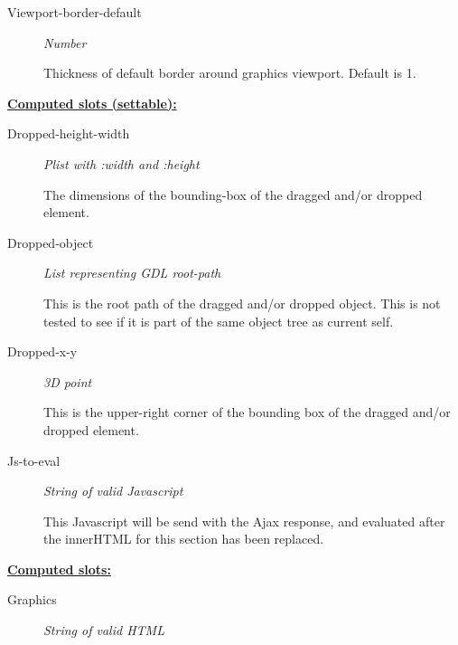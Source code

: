 \documentclass [11pt]{book}
\begin{document}
\begin{itemize}
\begin{description}
\item [Viewport-border-default]
\emph{Number}

 Thickness of default border around graphics viewport.
Default is 1.




\end{description}






\textbf{
\underline{Computed slots (settable):}}

\begin{description}

\item [Dropped-height-width]
\emph{Plist with :width and :height}

 The dimensions of the bounding-box of the dragged and/or dropped element.




\item [Dropped-object]
\emph{List representing GDL root-path}

 This is the root path of the dragged and/or dropped object.
This is not tested to see if it is part of the same object tree as current self.




\item [Dropped-x-y]
\emph{3D point}

 This is the upper-right corner of the bounding box of the dragged and/or dropped element.




\item [Js-to-eval]
\emph{String of valid Javascript}

 This Javascript will be send with the Ajax response,
and evaluated after the innerHTML for this section has been replaced.




\end{description}






\textbf{
\underline{Computed slots:}}

\begin{description}

\item [Graphics]
\emph{String of valid HTML}


\end{description}
\end{itemize}
\end{document}

